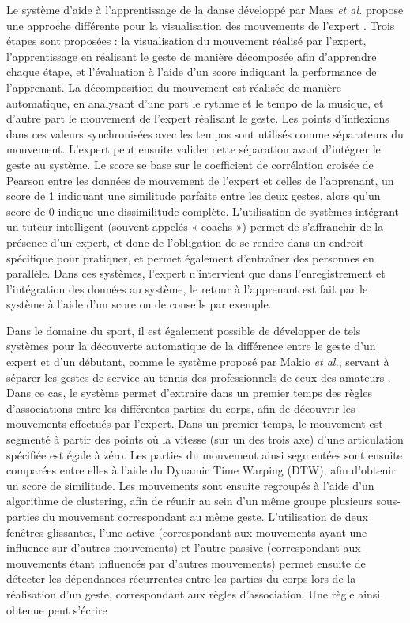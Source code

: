 Le système d'aide à l'apprentissage de la danse développé par Maes \textit{et al.} propose une approche différente pour la visualisation des mouvements de l'expert \parencite{Maes2012DtM}. Trois étapes sont proposées : la visualisation du mouvement réalisé par l'expert, l'apprentissage en réalisant le geste de manière décomposée afin d'apprendre chaque étape, et l'évaluation à l'aide d'un score indiquant la performance de l'apprenant. La décomposition du mouvement est réalisée de manière automatique, en analysant d'une part le rythme et le tempo de la musique, et d'autre part le mouvement de l'expert réalisant le geste. Les points d'inflexions dans ces valeurs synchronisées avec les tempos sont utilisés comme séparateurs du mouvement. L'expert peut ensuite valider cette séparation avant d'intégrer le geste au système. Le score se base sur le coefficient de corrélation croisée de Pearson entre les données de mouvement de l'expert et celles de l'apprenant, un score de 1 indiquant une similitude parfaite entre les deux gestes, alors qu'un score de 0 indique une dissimilitude complète. L'utilisation de systèmes intégrant un tuteur intelligent (souvent appelés « coachs ») permet de s'affranchir de la présence d'un expert, et donc de l'obligation de se rendre dans un endroit spécifique pour pratiquer, et permet également d'entraîner des personnes en parallèle. Dans ces systèmes, l'expert n'intervient que dans l'enregistrement et l'intégration des données au système, le retour à l'apprenant est fait par le système à l'aide d'un score ou de conseils par exemple.

Dans le domaine du sport, il est également possible de développer de tels systèmes pour la découverte automatique de la différence entre le geste d'un expert et d'un débutant, comme le système proposé par Makio \textit{et al.}, servant à séparer les gestes de service au tennis des professionnels de ceux des amateurs \parencite{Makio2007DoS}. Dans ce cas, le système permet d'extraire dans un premier temps des règles d'associations entre les différentes parties du corps, afin de découvrir les mouvements effectués par l'expert. Dans un premier temps, le mouvement est segmenté à partir des points où la vitesse (sur un des trois axe) d'une articulation spécifiée est égale à zéro. Les parties du mouvement ainsi segmentées sont ensuite comparées entre elles à l'aide du Dynamic Time Warping (DTW), afin d'obtenir un score de similitude. Les mouvements sont ensuite regroupés à l'aide d'un algorithme de clustering, afin de réunir au sein d'un même groupe plusieurs sous-parties du mouvement correspondant au même geste. L'utilisation de deux fenêtres glissantes, l'une active (correspondant aux mouvements ayant une influence sur d'autres mouvements) et l'autre passive (correspondant aux mouvements étant influencés par d'autres mouvements) permet ensuite de détecter les dépendances récurrentes entre les parties du corps lors de la réalisation d'un geste, correspondant aux règles d'association. Une règle ainsi obtenue peut s'écrire

